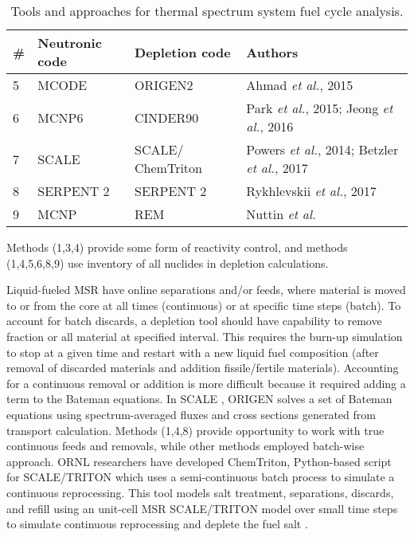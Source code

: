 \begin{table}[h!]
\centering
\caption{Tools and approaches for thermal spectrum system fuel cycle analysis.}
\begin{tabular}{ |m{}|m{}|m{}|m{}|} 
\hline
\# & Neutronic code  & Depletion code    & Authors         \\[5pt]
\hline
5 & MCODE \cite{xu_mcode_2008}      & ORIGEN2 \cite{croff_users_1980}      & Ahmad \emph{et al.}, 2015 \cite{ahmad_neutronics_2015}     \\[5pt]
\hline
6 & \gls{MCNP}6     & CINDER90 \cite{goorley_mcnp6_2013}     & Park \emph{et al.}, 2015; Jeong \emph{et al.}, 2016 \cite{park_whole_2015, jeong_equilibrium_2016}\\[5pt]
\hline
7 & SCALE \cite{bowman_scale_2011}      & SCALE/ ChemTriton \cite{powers_new_2013}    & Powers \emph{et al.}, 2014; Betzler \emph{et al.}, 2017 \cite{powers_new_2013,powers_inventory_2014,betzler_molten_2017}\\[5pt]
\hline
8 & SERPENT 2      & SERPENT 2     & Rykhlevskii \emph{et al.}, 2017 \cite{rykhlevskii_online_2017} \\[5pt]
\hline
9 & \gls{MCNP}      & REM  & Nuttin \emph{et al.} \cite{nuttin_potential_2005}    \\[5pt]
\hline
\end{tabular}
  \label{tab:th_codes}
\end{table}

Methods (1,3,4) provide some form of reactivity control, and methods (1,4,5,6,8,9) use inventory of all nuclides in depletion calculations. 

Liquid-fueled \gls{MSR} have online separations and/or feeds, where material is moved to or from the core at all times (continuous) or at specific time steps (batch). To account for batch discards, a depletion tool should have capability to remove fraction or all material at specified interval. This requires the burn-up simulation to stop at a given time and restart with a new liquid fuel composition (after removal of discarded materials and addition fissile/fertile materials). Accounting for a continuous removal or addition is more difficult because it required adding a term to the Bateman equations. In SCALE \cite{bowman_scale_2011}, ORIGEN \cite{gauld_isotopic_2011} solves a set of Bateman equations using spectrum-averaged fluxes and cross sections generated from transport calculation. Methods (1,4,8) provide opportunity to work with true continuous feeds and removals, while other methods employed batch-wise approach. \gls{ORNL} researchers have developed ChemTriton, Python-based script for SCALE/TRITON which uses a semi-continuous batch process to simulate a continuous reprocessing. This tool models salt treatment, separations, discards, and refill using an unit-cell \gls{MSR} SCALE/TRITON model over small time steps to simulate continuous reprocessing and deplete the fuel salt \cite{powers_new_2013}.

